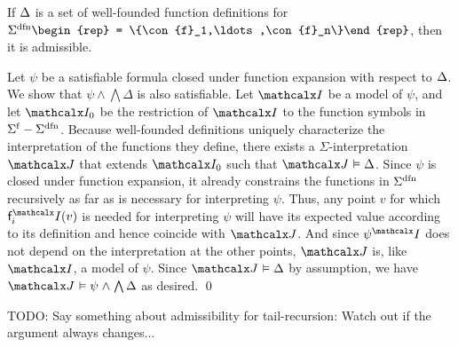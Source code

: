 \begin{theorem}\label{thm:adm}
If $\DDD$ is a set of well-founded function definitions for\/
$\sfundefs{\Sigma} \begin{rep} = \{\con{f}_1,\ldots,\con{f}_n\}\end{rep}$, then it is admissible.
\end{theorem}
\begin{rep}
\begin{proofsketch}
Let $\psi$ be a satisfiable formula closed under function expansion with
respect to $\DDD$. We show that $\psi \wedge \bigwedge \Delta$ is also
satisfiable. Let $\I$ be a model of $\psi$, and
let $\I_0$ be the restriction of $\I$ to the function symbols in $\sfuns{\Sigma} -
\sfundefs{\Sigma}$. Because well-founded definitions uniquely characterize
the interpretation of the functions they define, there exists a
$\Sigma$-interpretation $\J$ that extends $\I_0$ such that $\J \models \Delta$.
%
Since $\psi$ is closed under function expansion, it already constrains the
functions in $\sfundefs{\Sigma}$ recursively as far as is
necessary for interpreting $\psi$. Thus, any point $v$ for which
$\const{f}_i^\I(v)$ is needed for interpreting $\psi$ will have its
expected value according to its definition and hence coincide with $\J$.
And since $\psi^\I$ does not depend on the interpretation at the other
points, $\J$ is, like $\I$, a model of $\psi$.
Since $\J \models \Delta$ by assumption, we have $\J \models \psi \wedge
\bigwedge \Delta$ as desired.
\qed
\end{proofsketch}
\end{rep}

TODO: Say something about admissibility for tail-recursion: Watch out if the
argument always changes...


